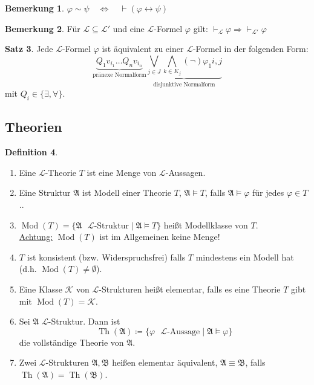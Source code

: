 \documentclass[12pt,parskip=full]{scrartcl}
\newcommand{\heading}{\underline}
\theoremstyle{definition}
\newtheorem{theorem}{Satz}[section]
\newtheorem{definition}[theorem]{Definition}
\newtheorem{remark}[theorem]{Bemerkung}
\begin{document}
	\begin{remark}
		$\varphi \sim \psi \quad\Leftrightarrow\quad \vdash (\varphi \leftrightarrow \psi)$
	\end{remark}

	\begin{remark}
		Für $\mathcal{L} \subseteq \mathcal{L'}$ und eine $\mathcal{L}$-Formel $\varphi$ gilt: $\vdash_\mathcal{L} \varphi \Rightarrow \vdash_\mathcal{L'} \varphi$
	\end{remark}

	\begin{theorem}
		Jede $\mathcal{L}$-Formel $\varphi$ ist äquivalent zu einer $\mathcal{L}$-Formel in der folgenden Form:
		\begin{equation*}
			\underbrace{Q_1 v_{i_1} \dots Q_n v_{i_n}}_\text{pränexe Normalform} \underbrace{\bigvee_{j \in J} \bigwedge_{k \in K_j} (\lnot) \varphi_1{i,j}}_\text{disjunktive Normalform}
		\end{equation*}
		mit $Q_i \in \{ \exists, \forall \}$.
	\end{theorem}

	\subsection{Theorien}
	
	\begin{definition}
		\begin{enumerate}
			\item Eine $\mathcal{L}$-Theorie $T$ ist eine Menge von $\mathcal{L}$-Aussagen.
			\item Eine Struktur $\mathfrak{A}$ ist Modell einer Theorie $T$, $\mathfrak{A} \models T$, falls $\mathfrak{A} \models \varphi$ für jedes $\varphi \in T$..
			\item $\operatorname{Mod}(T) = \{ \mathfrak{A} \text{ $\mathcal{L}$-Struktur} \mid \mathfrak{A} \models T \}$ heißt Modellklasse von $T$. \\
			\heading{Achtung:} $\operatorname{Mod}(T)$ ist im Allgemeinen keine Menge!
			\item $T$ ist konsistent (bzw. Widerspruchsfrei) falls $T$ mindestens ein Modell hat (d.h. $\operatorname{Mod}(T) \neq \emptyset$).
			\item Eine Klasse $\mathcal{K}$ von $\mathcal{L}$-Strukturen heißt elementar, falls es eine Theorie $T$ gibt mit $\operatorname{Mod}(T) = \mathcal{K}$.
			\item Sei $\mathfrak{A}$ $\mathcal{L}$-Struktur. Dann ist
			\begin{equation*}
				\operatorname{Th}(\mathfrak{A}) \coloneqq \{ \text{$\varphi$ $\mathcal{L}$-Aussage} \mid \mathfrak{A} \models \varphi \}
			\end{equation*}
			die vollständige Theorie von $\mathfrak{A}$.
			\item Zwei $\mathcal{L}$-Strukturen $\mathfrak{A}, \mathfrak{B}$ heißen elementar äquivalent, $\mathfrak{A} \equiv \mathfrak{B}$, falls $\operatorname{Th}(\mathfrak{A}) = \operatorname{Th}(\mathfrak{B})$.
		\end{enumerate}
	\end{definition}
\end{document}
